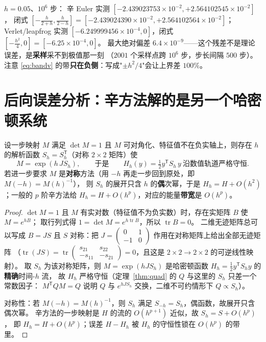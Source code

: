 \begin{remark}[实测：闭式到九位]
$h=0.05$、$10^6$ 步：
辛 Euler 实测 $[-2.439023753\times10^{-2},+2.564102545\times10^{-2}]$，
闭式 $[-\tfrac{h}{2+h},\tfrac{h}{2-h}]=[-2.439024390\times10^{-2},+2.564102564\times10^{-2}]$；
Verlet/leapfrog 实测 $[-6.249999456\times10^{-4},0]$，闭式 $[-\tfrac{h^2}{4},0]=[-6.25\times10^{-4},0]$。
最大绝对偏差 $6.4\times10^{-9}$——这个残差不是理论误差，是\textbf{采样}采不到极值那一刻
（$2001$ 个采样点跨 $10^6$ 步，步长间隔 $500$ 步）。
注意 \eqref{eq:bandv} 的带\textbf{只在负侧}：写成"$\pm h^2/4$"会让上界差 $100\%$。
\end{remark}

\section{后向误差分析：辛方法解的是另一个哈密顿系统}
\label{sec:backward}

\begin{theorem}[线性系统上的精确版后向误差分析]
\label{thm:backward}
设一步映射 $M$ 满足 $\det M=1$ 且 $M$ 可对角化、特征值不在负实轴上，则存在
$h$ 的解析函数 $S_h=S_h^{\mathsf T}$（对称 $2\times2$ 矩阵）使
\begin{equation}
  M=\exp(h\,J S_h),\qquad\text{于是}\qquad
  H_h(y)=\tfrac12 y^{\mathsf T}S_h\,y\ \text{沿数值轨道严格守恒}.
\end{equation}
若进一步要求 $M$ 是\textbf{对称}方法（用 $-h$ 再走一步回到原处，即 $M(-h)=M(h)^{-1}$），
则 $S_h$ 的展开只含 $h$ 的\textbf{偶}次幂，于是 $H_h=H+O(h^2)$；一般的 $p$ 阶辛方法给
$H_h=H+O(h^p)$，对应的能量\textbf{带宽}是 $O(h^p)$。
\end{theorem}

\begin{proof}
$\det M=1$ 且 $M$ 有实对数（特征值不为负实数）时，存在实矩阵 $B$ 使 $M=e^{hB}$；
取行列式得 $1=\det M=e^{h\operatorname{tr}B}$，所以 $\operatorname{tr}B=0$。
二维无迹矩阵总可以写成 $B=JS$ 且 $S$ 对称：把
$J=\begin{pmatrix}0&1\\-1&0\end{pmatrix}$ 作用在对称矩阵上给出全部无迹矩阵
（$\operatorname{tr}(JS)=\operatorname{tr}\begin{pmatrix}s_{21}&s_{22}\\-s_{11}&-s_{21}\end{pmatrix}=0$，且这是 $2\times2\to2\times2$ 的可逆线性映射）。
取 $S_h$ 为该对称矩阵，则 $M=\exp(hJS_h)$ 是哈密顿函数 $H_h=\tfrac12y^{\mathsf T}S_hy$ 的\textbf{精确}时间-$h$ 流，
故 $H_h$ 严格守恒（定理~\ref{thm:quad} 的 $Q$ 与这里的 $S_h$ 只差一个常数因子：
$M^{\mathsf T}QM=Q$ 说明 $Q$ 与 $e^{hJS_h}$ 交换，二维不可约情形下 $Q\propto S_h$）。

对称性：若 $M(-h)=M(h)^{-1}$，则 $S_h$ 满足 $S_{-h}=S_h$，偶函数，故展开只含偶次幂。
辛方法的一步映射是 $H$ 的流的 $O(h^{p+1})$ 近似，故 $S_h=S+O(h^p)$，
即 $H_h=H+O(h^p)$；误差 $H-H_h$ 被 $H_h$ 的守恒性锁在 $O(h^p)$ 的带里。
\end{proof}

